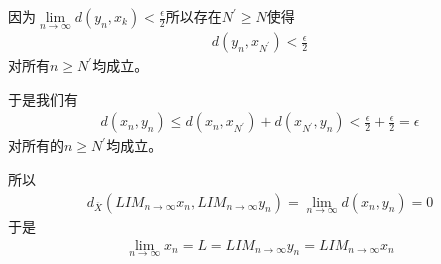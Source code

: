 \documentclass{article}
\begin{document}
\begin{itemize}
        因为$\lim\limits_{n \to \infty} d(y_n, x_k) < \frac{\epsilon}{2}$所以存在$N^\prime \geq N$使得
        \begin{align*}
          d(y_n, x_{N^\prime}) < \frac{\epsilon}{2}
        \end{align*}
        对所有$n \geq N^\prime$均成立。

        于是我们有
        \begin{align*}
          d(x_n, y_n) \leq d(x_n, x_{N^\prime}) + d(x_{N^\prime}, y_n) < \frac{\epsilon}{2} + \frac{\epsilon}{2} = \epsilon
        \end{align*}
        对所有的$n \geq N^\prime$均成立。

        所以
        \begin{align*}
          d_{\overline{X}}(LIM_{n \to \infty} x_n, LIM_{n \to \infty} y_n) = \lim\limits_{n \to \infty} d(x_n, y_n) = 0
        \end{align*}
        于是
        \begin{align*}
          \lim\limits_{n \to \infty} x_n = L = LIM_{n \to \infty} y_n = LIM_{n \to \infty} x_n
        \end{align*}
\end{itemize}
\end{document}
